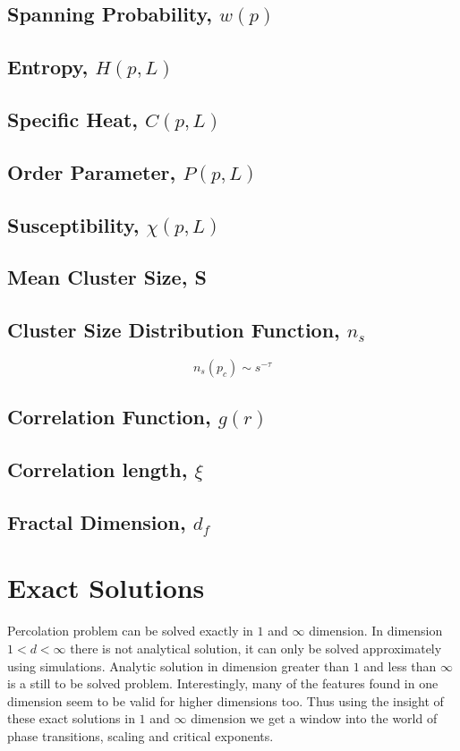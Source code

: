 	\subsection{Spanning Probability, $w(p)$}
	\subsection{Entropy, $H(p,L)$}
	\subsection{Specific Heat, $C(p,L)$}
	\subsection{Order Parameter, $P(p,L)$}
	\subsection{Susceptibility, $\chi(p,L)$}
	\subsection{Mean Cluster Size, S}
	\subsection{Cluster Size Distribution Function, $n_s$} \label{subsect:cluster-size-dist-func}
		\begin{equation}
			n_s(p_c)\sim s^{-\tau}
		\end{equation}
	\subsection{Correlation Function, $g(r)$}		
	\subsection{Correlation length, $\xi$}
	\subsection{Fractal Dimension, $d_f$} \label{subsect:fractal-dim}

\section{Exact Solutions}
	Percolation problem can be solved exactly in $1$ and $\infty$ dimension. In dimension $1 < d < \infty$ there is not analytical solution, it can only be solved approximately using simulations. Analytic solution in dimension greater than $1$ and less than $\infty$ is a still to be solved problem. Interestingly, many of the features found in one dimension seem to be valid for higher dimensions too. Thus using the insight of these exact solutions in $1$ and $\infty$ dimension we get a window into the world of phase transitions, scaling and critical exponents.
